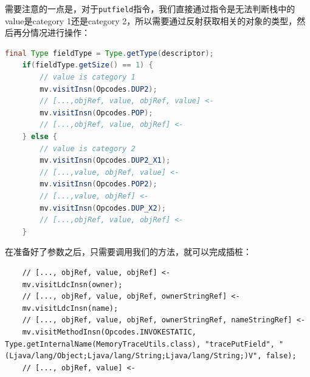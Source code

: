 \documentclass[UTF8]{ctexart}
\begin{document}
需要注意的一点是，对于\texttt{putfield}指令，我们直接通过指令是无法判断栈中的value是category 1还是category 2，所以需要通过反射获取相关的对象的类型，然后再分情况进行操作：
\begin{lstlisting}[language=Java]
    final Type fieldType = Type.getType(descriptor);
    if(fieldType.getSize() == 1) {
        // value is category 1
        mv.visitInsn(Opcodes.DUP2);
        // [...,objRef, value, objRef, value] <-
        mv.visitInsn(Opcodes.POP);
        // [...,objRef, value, objRef] <-
    } else {
        // value is category 2
        mv.visitInsn(Opcodes.DUP2_X1);
        // [...,value, objRef, value] <-
        mv.visitInsn(Opcodes.POP2);
        // [...,value, objRef] <-
        mv.visitInsn(Opcodes.DUP_X2);
        // [...,objRef, value, objRef] <-
    }
\end{lstlisting}
在准备好了参数之后，只需要调用我们的方法，就可以完成插桩：
\begin{lstlisting}
    // [..., objRef, value, objRef] <-
    mv.visitLdcInsn(owner);
    // [..., objRef, value, objRef, ownerStringRef] <-
    mv.visitLdcInsn(name);
    // [..., objRef, value, objRef, ownerStringRef, nameStringRef] <-
    mv.visitMethodInsn(Opcodes.INVOKESTATIC, Type.getInternalName(MemoryTraceUtils.class), "tracePutField", "(Ljava/lang/Object;Ljava/lang/String;Ljava/lang/String;)V", false);
    // [..., objRef, value] <-
\end{lstlisting}
\end{document}
